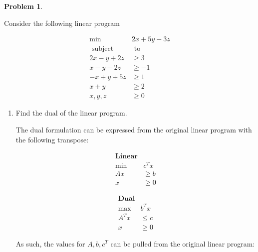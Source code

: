 \documentclass[11pt]{article}
\theoremstyle{definition}
\theoremstyle{case}
\theoremstyle{theorem}
\newtheorem{prob}{Problem}
\begin{document}
\newpage

\begin{prob}
\end{prob}

Consider the following linear program

\begin{align*}
  \min &2x + 5y -3z\\
  \text{ subject} &\text{ to }\\
  2x - y + 2z &\geq 3\\
  x - y - 2z &\geq -1\\
  -x + y +5z &\geq 1\\
  x + y &\geq 2\\
  x,y,z &\geq 0
\end{align*}

\begin{enumerate}[label=(\alph*)]

\item Find the dual of the linear program. 

The dual formulation can be expressed from the original linear program
with the following transpose:

\begin{minipage}[t]{0.48\textwidth}
\begin{align*}
  \textbf{Linear} \\
  \min & c^T x \\
  Ax &\geq b \\
  x &\geq 0
\end{align*}
\end{minipage}
\begin{minipage}[t]{0.48\textwidth}
\begin{flushright}
\begin{align*}
  \textbf{Dual}\\
  \max &b^T x \\
  A^Tx &\leq c \\
  x &\geq 0
\end{align*}
\end{flushright}
\end{minipage}

As such, the values for $A, b, c^T$ can be pulled from the original linear program:


\end{enumerate}
\end{document}
